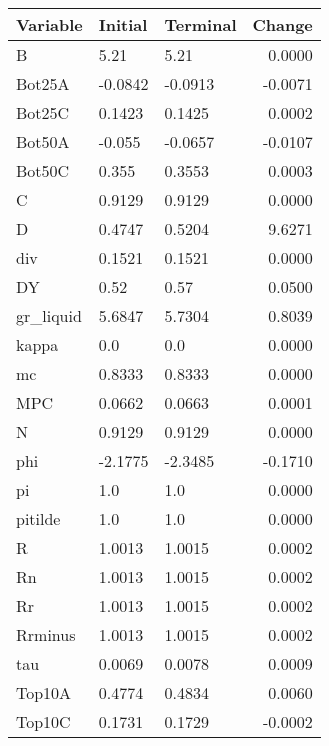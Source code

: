 \begin{table}
\centering
\label{tab:stst_comparison_baseline_limit_permanent_asymmetric}
\begin{tabular}{lllr}
\toprule
                Variable & Initial & Terminal &  Change \\
\midrule
                       B &    5.21 &     5.21 &  0.0000 \\
                  Bot25A & -0.0842 &  -0.0913 & -0.0071 \\
                  Bot25C &  0.1423 &   0.1425 &  0.0002 \\
                  Bot50A &  -0.055 &  -0.0657 & -0.0107 \\
                  Bot50C &   0.355 &   0.3553 &  0.0003 \\
                       C &  0.9129 &   0.9129 &  0.0000 \\
                       D &  0.4747 &   0.5204 &  9.6271 \\
                     div &  0.1521 &   0.1521 &  0.0000 \\
                      DY &    0.52 &     0.57 &  0.0500 \\
               gr\_liquid &  5.6847 &   5.7304 &  0.8039 \\
                   kappa &     0.0 &      0.0 &  0.0000 \\
                      mc &  0.8333 &   0.8333 &  0.0000 \\
                     MPC &  0.0662 &   0.0663 &  0.0001 \\
                       N &  0.9129 &   0.9129 &  0.0000 \\
                     phi & -2.1775 &  -2.3485 & -0.1710 \\
                      pi &     1.0 &      1.0 &  0.0000 \\
                 pitilde &     1.0 &      1.0 &  0.0000 \\
                       R &  1.0013 &   1.0015 &  0.0002 \\
                      Rn &  1.0013 &   1.0015 &  0.0002 \\
                      Rr &  1.0013 &   1.0015 &  0.0002 \\
                 Rrminus &  1.0013 &   1.0015 &  0.0002 \\
                     tau &  0.0069 &   0.0078 &  0.0009 \\
                  Top10A &  0.4774 &   0.4834 &  0.0060 \\
                  Top10C &  0.1731 &   0.1729 & -0.0002 \\

\end{tabular}
\end{table}

